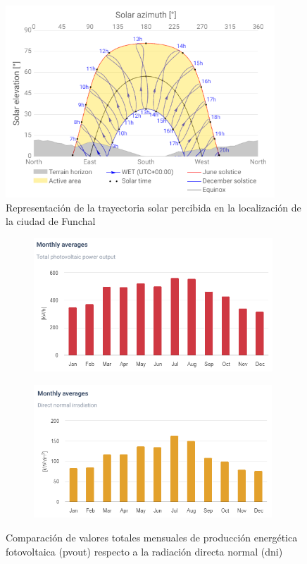 \begin{figure}[H]
    \centering
    \includegraphics[width=0.9\textwidth]{img/diseno/azimut.png}
    \caption{Representación de la trayectoria solar percibida en la localización de la ciudad de Funchal \cite{globalsolar}}
    \label{fig:azimut}
\end{figure}

\vspace{3mm}

\begin{figure}[H]
    \centering    
    \begin{subfigure}{0.5\linewidth}
        \centering
        \includegraphics[width=\linewidth,height=5cm]{img/diseno/averagepvout.png}
        \label{fig:averagepvout}
    \end{subfigure}\hfill
    \begin{subfigure}{0.5\linewidth}
        \centering
        \includegraphics[width=\linewidth,height=5cm]{img/diseno/averagedni.png}
        \label{fig:averagedni}
    \end{subfigure}    
    \caption{Comparación de valores totales mensuales de producción energética fotovoltaica (\acrshort{pvout}) respecto a la radiación directa normal (\acrshort{dni}) \cite{globalsolar}}
    \label{fig:average}
\end{figure}


